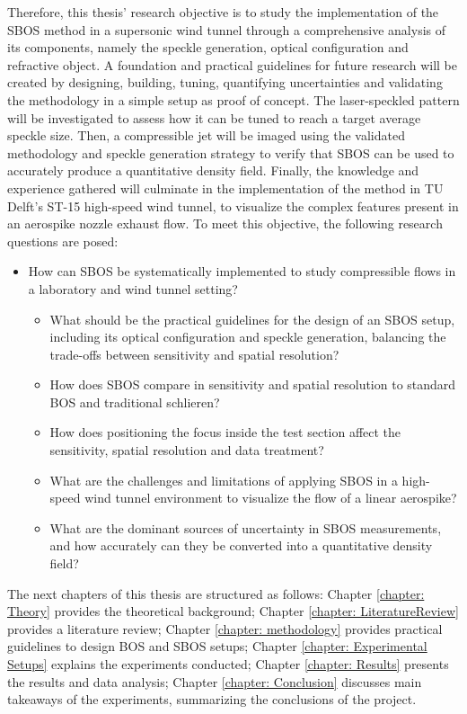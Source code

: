 \par Therefore, this thesis' research objective is to study the implementation of the SBOS method in a supersonic wind tunnel through a comprehensive analysis of its components, namely the speckle generation, optical configuration and refractive object. A foundation and practical guidelines for future research will be created by designing, building, tuning, quantifying uncertainties and validating the methodology in a simple setup as proof of concept. The laser-speckled pattern will be investigated to assess how it can be tuned to reach a target average speckle size. Then, a compressible jet will be imaged using the validated methodology and speckle generation strategy to verify that SBOS can be used to accurately produce a quantitative density field. Finally, the knowledge and experience gathered will culminate in the implementation of the method in TU Delft's ST-15 high-speed wind tunnel, to visualize the complex features present in an aerospike nozzle exhaust flow. To meet this objective, the following research questions are posed:
\begin{itemize}
    \item How can SBOS be systematically implemented to study compressible flows in a laboratory and wind tunnel setting?
    \begin{itemize}
        \item What should be the practical guidelines for the design of an SBOS setup, including its optical configuration and speckle generation, balancing the trade-offs between sensitivity and spatial resolution?
        \item How does SBOS compare in sensitivity and spatial resolution to standard BOS and traditional schlieren?
        \item How does positioning the focus inside the test section affect the sensitivity, spatial resolution and data treatment?
        \item What are the challenges and limitations of applying SBOS in a high-speed wind tunnel environment to visualize the flow of a linear aerospike?
        \item What are the dominant sources of uncertainty in SBOS measurements, and how accurately can they be converted into a quantitative density field?
    \end{itemize}
\end{itemize}

\par The next chapters of this thesis are structured as follows: Chapter \ref{chapter: Theory} provides the theoretical background; Chapter \ref{chapter: LiteratureReview} provides a literature review; Chapter \ref{chapter: methodology} provides practical guidelines to design BOS and SBOS setups; Chapter \ref{chapter: Experimental Setups} explains the experiments conducted; Chapter \ref{chapter: Results} presents the results and data analysis; Chapter \ref{chapter: Conclusion} discusses main takeaways of the experiments, summarizing the conclusions of the project.
